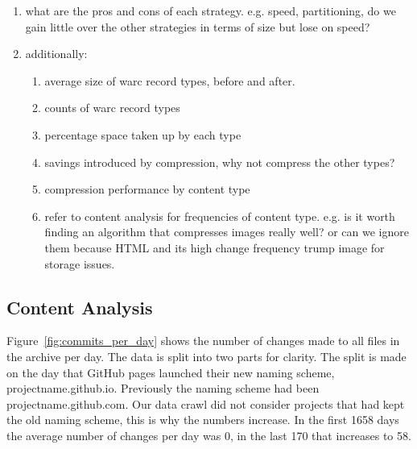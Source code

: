 \documentclass[11pt]{article}
\begin{document}
\begin{enumerate}
\item what are the pros and cons of each strategy. e.g. speed, partitioning, do we gain little over the other strategies in terms of size but lose on speed?
\item additionally:
\begin{enumerate}
\item average size of warc record types, before and after.
\item counts of warc record types
\item percentage space taken up by each type
\item savings introduced by compression, why not compress the other types?
\item compression performance by content type
\item refer to content analysis for frequencies of content type. e.g. is it worth finding an algorithm that compresses images really well? or can we ignore them because HTML and its high change frequency trump image for storage issues.
\end{enumerate}
\end{enumerate}

\subsection{Content Analysis}

Figure~\ref{fig:commits_per_day} shows the number of changes made to all files in the archive per day. The data is split into two parts for clarity. The split is made on the day that GitHub pages launched their new naming scheme, projectname.github.io. Previously the naming scheme had been projectname.github.com. Our data crawl did not consider projects that had kept the old naming scheme, this is why the numbers increase. In the first 1658 days the average number of changes per day was 0, in the last 170 that increases to 58.

\end{document}
